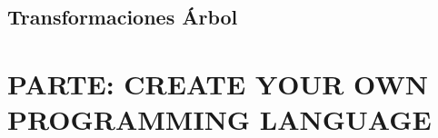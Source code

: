 \documentclass[11pt,a4paper,oneside,onecolumn]{book}
\begin{document}

\chapter{Transformaciones Árbol}





%


%


%

%


\part{PARTE: CREATE YOUR OWN PROGRAMMING LANGUAGE}


%
\end{document}
